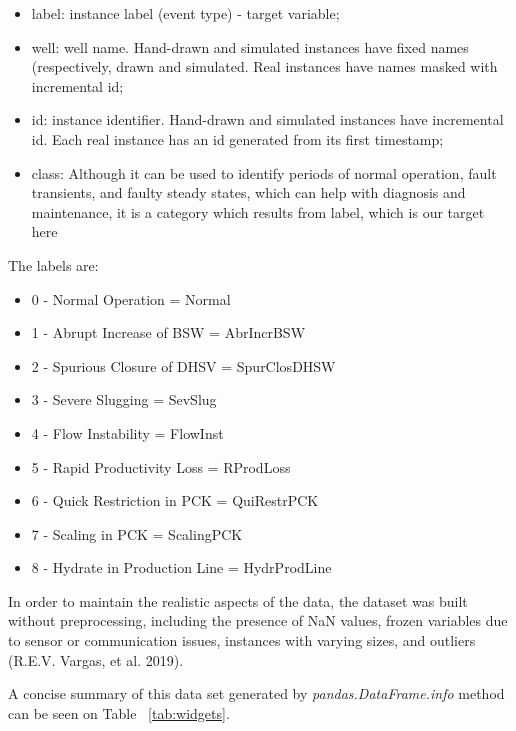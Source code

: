 \documentclass{article}
\begin{document}
\begin{itemize}
\item label: instance label (event type) - target variable;
\item well: well name. Hand-drawn and simulated instances have fixed names (respectively, drawn and simulated. Real instances have names masked with incremental id;
\item id: instance identifier. Hand-drawn and simulated instances have incremental id. Each real instance has an id generated from its first timestamp;
\item class: Although it can be used to identify periods of normal operation, fault transients, and faulty steady states, which can help with diagnosis and maintenance, it is a category which results from label, which is our target here
\end{itemize}

The labels are:

\begin{itemize}
\item 0 - Normal Operation = Normal
\item 1 - Abrupt Increase of BSW = AbrIncrBSW
\item 2 - Spurious Closure of DHSV = SpurClosDHSW
\item 3 - Severe Slugging = SevSlug
\item 4 - Flow Instability = FlowInst
\item 5 - Rapid Productivity Loss = RProdLoss
\item 6 - Quick Restriction in PCK = QuiRestrPCK
\item 7 - Scaling in PCK = ScalingPCK
\item 8 - Hydrate in Production Line = HydrProdLine
\end{itemize}

In order to maintain the realistic aspects of the data, the dataset was built without preprocessing, including the presence of NaN values, frozen variables due to sensor or communication issues, instances with varying sizes, and outliers (R.E.V. Vargas, et al. 2019).

A concise summary of this data set generated by \emph{pandas.DataFrame.info} method can be seen on Table ~\ref{tab:widgets}.
\end{document}
